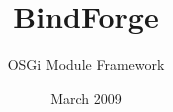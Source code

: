 \documentclass[
				a4paper,
				chapterprefix,
				appendixprefix,
				normalheadings,
				headsepline,
				12pt,
				DIV12,
				oneside,
				bibtotoc]
				{scrbook}
\begin{document}
\title{BindForge}


\author{OSGi Module Framework}

\date{March 2009}


\maketitle

\tableofcontents


\clearpage
{}



\clearpage
{}


\end{document}
